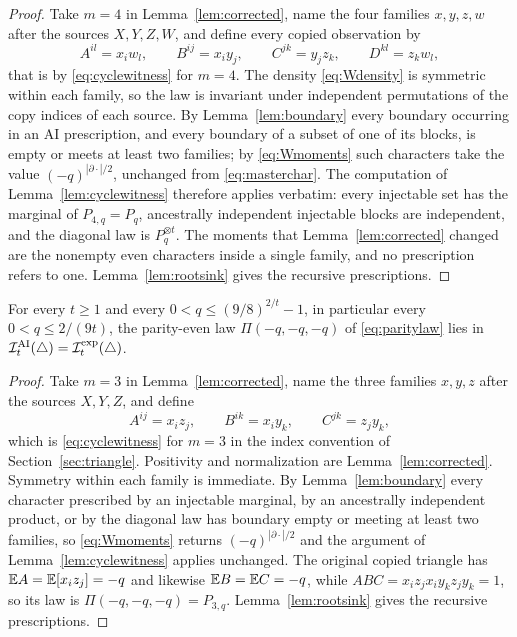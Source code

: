 \begin{proof}
Take $m=4$ in Lemma~\ref{lem:corrected}, name the four families $x,y,z,w$ after the sources $X,Y,Z,W$, and define every copied observation by
\[
A^{il}=x_iw_l,\qquad B^{ij}=x_iy_j,\qquad C^{jk}=y_jz_k,\qquad D^{kl}=z_kw_l,
\]
that is by \eqref{eq:cyclewitness} for $m=4$. The density \eqref{eq:Wdensity} is symmetric within each family, so the law is invariant under independent permutations of the copy indices of each source. By Lemma~\ref{lem:boundary} every boundary occurring in an AI prescription, and every boundary of a subset of one of its blocks, is empty or meets at least two families; by \eqref{eq:Wmoments} such characters take the value $(-q)^{|\partial\cdot|/2}$, unchanged from \eqref{eq:masterchar}. The computation of Lemma~\ref{lem:cyclewitness} therefore applies verbatim: every injectable set has the marginal of $P_{4,q}=P_q$, ancestrally independent injectable blocks are independent, and the diagonal law is $P_q^{\otimes t}$. The moments that Lemma~\ref{lem:corrected} changed are the nonempty even characters inside a single family, and no prescription refers to one. Lemma~\ref{lem:rootsink} gives the recursive prescriptions.
\end{proof}

\begin{theorem}[The triangle at $q=\Theta(1/t)$]\label{thm:trianglelinear}
For every $t\ge1$ and every $0<q\le(9/8)^{2/t}-1$, in particular every $0<q\le2/(9t)$, the parity-even law $\Pi(-q,-q,-q)$ of \eqref{eq:paritylaw} lies in $\mathcal I^{\mathrm{AI}}_t(\triangle)=\mathcal I^{\mathrm{exp}}_t(\triangle)$.
\end{theorem}

\begin{proof}
Take $m=3$ in Lemma~\ref{lem:corrected}, name the three families $x,y,z$ after the sources $X,Y,Z$, and define
\[
A^{ij}=x_iz_j,\qquad B^{ik}=x_iy_k,\qquad C^{jk}=z_jy_k,
\]
which is \eqref{eq:cyclewitness} for $m=3$ in the index convention of Section~\ref{sec:triangle}. Positivity and normalization are Lemma~\ref{lem:corrected}. Symmetry within each family is immediate. By Lemma~\ref{lem:boundary} every character prescribed by an injectable marginal, by an ancestrally independent product, or by the diagonal law has boundary empty or meeting at least two families, so \eqref{eq:Wmoments} returns $(-q)^{|\partial\cdot|/2}$ and the argument of Lemma~\ref{lem:cyclewitness} applies unchanged. The original copied triangle has $\mathbb E A=\mathbb E[x_iz_j]=-q$ and likewise $\mathbb E B=\mathbb E C=-q$, while $ABC=x_iz_jx_iy_kz_jy_k=1$, so its law is $\Pi(-q,-q,-q)=P_{3,q}$. Lemma~\ref{lem:rootsink} gives the recursive prescriptions.
\end{proof}

